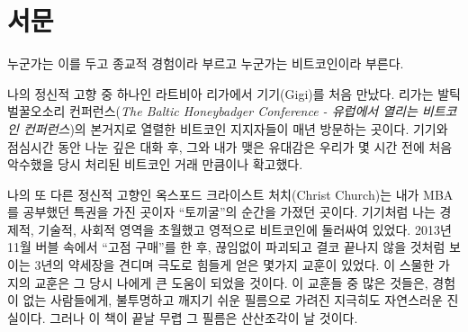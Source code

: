 \chapter*{서문}

누군가는 이를 두고 종교적 경험이라 부르고  
누군가는 비트코인이라 부른다.


나의 정신적 고향 중 하나인 라트비아 리가에서 기기(Gigi)를 처음 만났다. 리가는 발틱 벌꿀오소리 컨퍼런스(\textit{The Baltic Honeybadger Conference - 유럽에서 열리는 비트코인 컨퍼런스})의 본거지로 열렬한 비트코인 지지자들이 매년 방문하는 곳이다. 
기기와 점심시간 동안 나눈 깊은 대화 후, 그와 내가 맺은 유대감은 우리가 몇 시간 전에 처음 악수했을 당시 처리된 비트코인 거래 만큼이나 확고했다. 



나의 또 다른 정신적 고향인 옥스포드 크라이스트 처치(Christ Church)는 내가 MBA를 공부했던 특권을 가진 곳이자 \enquote{토끼굴}의 순간을 가졌던 곳이다.
기기처럼 나는 경제적, 기술적, 사회적 영역을 초월했고 영적으로 비트코인에 둘러싸여 있었다. 
2013년 11월 버블 속에서 \enquote{고점 구매}를 한 후, 끊임없이 파괴되고 결코 끝나지 않을 것처럼 보이는 3년의 약세장을 견디며 극도로 힘들게 얻은 몇가지 교훈이 있었다.
이 스물한 가지의 교훈은 그 당시 나에게 큰 도움이 되었을 것이다. 
이 교훈들 중 많은 것들은, 경험이 없는 사람들에게, 불투명하고 깨지기 쉬운 필름으로 가려진 지극히도 자연스러운 진실이다.  그러나 이 책이 끝날 무렵 그 필름은 산산조각이 날 것이다.


